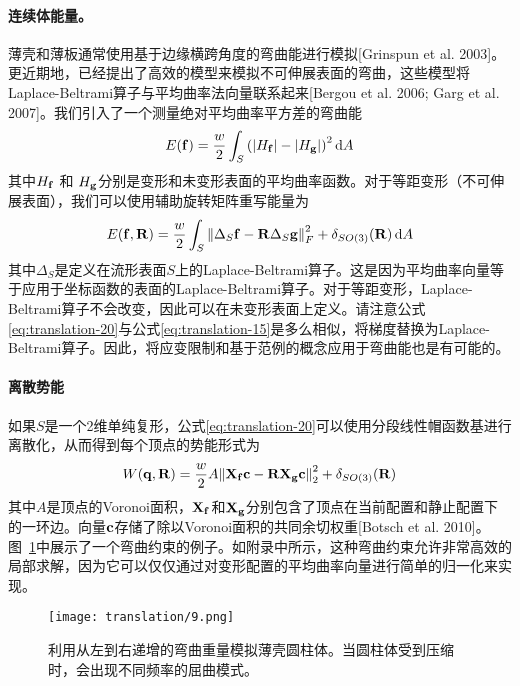 \begin{translation}
\paragraph{连续体能量。}

薄壳和薄板通常使用基于边缘横跨角度的弯曲能进行模拟[Grinspun et al. 2003]。更近期地，已经提出了高效的模型来模拟不可伸展表面的弯曲，这些模型将Laplace-Beltrami算子与平均曲率法向量联系起来[Bergou et al. 2006; Garg et al. 2007]。我们引入了一个测量绝对平均曲率平方差的弯曲能
\begin{equation}
  E(\vb{f}) = \frac{w}{2} \int_S \pqty{\abs{H_{\vb{f}}} - \abs{H_{\vb{g}}}}^2 \dd{A}
  \label{eq:translation-19}
\end{equation}
其中$H_{\vb{f}}$ 和 $H_{\vb{g}}$分别是变形和未变形表面的平均曲率函数。对于等距变形（不可伸展表面），我们可以使用辅助旋转矩阵重写能量为
\begin{equation}
  E(\vb{f}, \vb{R}) = \frac{w}{2} \int_S \norm{\Delta_S{\vb{f}} - \vb{R} \Delta_S{\vb{g}}}_F^2 + \delta_{SO(3)}(\vb{R}) \dd{A}
  \label{eq:translation-20}
\end{equation}
其中$\Delta_S$是定义在流形表面$S$上的Laplace-Beltrami算子。这是因为平均曲率向量等于应用于坐标函数的表面的Laplace-Beltrami算子。对于等距变形，Laplace-Beltrami算子不会改变，因此可以在未变形表面上定义。请注意公式\eqref{eq:translation-20}与公式\eqref{eq:translation-15}是多么相似，将梯度替换为Laplace-Beltrami算子。因此，将应变限制和基于范例的概念应用于弯曲能也是有可能的。

\paragraph{离散势能}

如果$S$是一个2维单纯复形，公式\eqref{eq:translation-20}可以使用分段线性帽函数基进行离散化，从而得到每个顶点的势能形式为
\begin{equation}
  W(\vb{q}, \vb{R}) = \frac{w}{2} A \norm{\vb{X}_{\vb{f}} \vb{c} - \vb{R} \vb{X}_{\vb{g}} \vb{c}}_2^2 + \delta_{SO(3)}(\vb{R})
  \label{eq:translation-21}
\end{equation}
其中$A$是顶点的Voronoi面积，$\vb{X}_{\vb{f}}$和$\vb{X}_{\vb{g}}$分别包含了顶点在当前配置和静止配置下的一环边。向量$\vb{c}$存储了除以Voronoi面积的共同余切权重[Botsch et al. 2010]。图~\ref{fig:translation-9}中展示了一个弯曲约束的例子。如附录中所示，这种弯曲约束允许非常高效的局部求解，因为它可以仅仅通过对变形配置的平均曲率向量进行简单的归一化来实现。

\begin{figure}
  \centering
  \texttt{[image: translation/9.png]}
  \caption{利用从左到右递增的弯曲重量模拟薄壳圆柱体。当圆柱体受到压缩时，会出现不同频率的屈曲模式。}
  \label{fig:translation-9}
\end{figure}


\end{translation}
